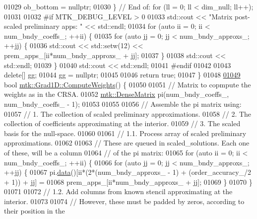 \begin{DoxyCode}
{{01029     ob\_bottom = \textcolor{keyword}{nullptr};
01030   \} \textcolor{comment}{// End of: for (ll = 0; ll < dim\_null; ll++);}
01031 
01032 \textcolor{preprocessor}{  #if MTK\_DEBUG\_LEVEL > 0}
01033   std::cout << \textcolor{stringliteral}{"Matrix post-scaled preliminary apps: "} << std::endl;
01034   \textcolor{keywordflow}{for} (\textcolor{keyword}{auto} ii = 0; ii < num\_bndy\_coeffs\_; ++ii) \{
01035     \textcolor{keywordflow}{for} (\textcolor{keyword}{auto} jj = 0; jj < num\_bndy\_approxs\_; ++jj) \{
01036       std::cout << std::setw(12) << prem\_apps\_[ii*num\_bndy\_approxs\_ + jj];
01037     \}
01038     std::cout << std::endl;
01039   \}
01040   std::cout << std::endl;
01041 \textcolor{preprocessor}{  #endif}
01042 
01043   \textcolor{keyword}{delete}[] gg;
01044   gg = \textcolor{keyword}{nullptr};
01045 
01046   \textcolor{keywordflow}{return} \textcolor{keyword}{true};
01047 \}
01048 
\hypertarget{mtk__grad__1d_8cc_source_l01049}{}\hyperlink{classmtk_1_1Grad1D_a224082617751864bffca9bfe494c36d5}{01049} \textcolor{keywordtype}{bool} \hyperlink{classmtk_1_1Grad1D_a224082617751864bffca9bfe494c36d5}{mtk::Grad1D::ComputeWeights}() \{
01050 
01051   \textcolor{comment}{// Matrix to copmpute the weights as in the CRSA.}
01052   \hyperlink{classmtk_1_1DenseMatrix}{mtk::DenseMatrix} pi(num\_bndy\_coeffs\_, num\_bndy\_coeffs\_ - 1);
01053 
01055 
01056   \textcolor{comment}{// Assemble the pi matrix using:}
01057   \textcolor{comment}{// 1. The collection of scaled preliminary approximations.}
01058   \textcolor{comment}{// 2. The collection of coefficients approximating at the interior.}
01059   \textcolor{comment}{// 3. The scaled basis for the null-space.}
01060 
01061   \textcolor{comment}{// 1.1. Process array of scaled preliminary approximations.}
01062 
01063   \textcolor{comment}{// These are queued in scaled\_solutions. Each one of these, will be a column}
01064   \textcolor{comment}{// of the pi matrix:}
01065   \textcolor{keywordflow}{for} (\textcolor{keyword}{auto} ii = 0; ii < num\_bndy\_coeffs\_; ++ii) \{
01066     \textcolor{keywordflow}{for} (\textcolor{keyword}{auto} jj = 0; jj < num\_bndy\_approxs\_; ++jj) \{
01067       pi.\hyperlink{classmtk_1_1DenseMatrix_a0c33b8a9e01d157c61ddbdf807c25d84}{data}()[ii*(2*(num\_bndy\_approxs\_ - 1) + (order\_accuracy\_/2 + 1)) + jj] =
01068         prem\_apps\_[ii*num\_bndy\_approxs\_ + jj];
01069     \}
01070   \}
01071 
01072   \textcolor{comment}{// 1.2. Add columns from known stencil approximating at the interior.}
01073 
01074   \textcolor{comment}{// However, these must be padded by zeros, according to their position in the}
}}
\end{DoxyCode}
